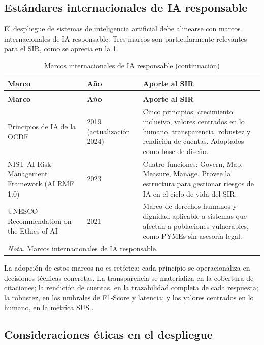 \documentclass[12pt,a4paper,oneside]{report}
\begin{document}
\subsection{Estándares internacionales de IA responsable}\label{subsec:estandares-internacionales-ia-responsable}

El despliegue de sistemas de inteligencia artificial debe alinearse con marcos internacionales de IA responsable. Tres marcos son particularmente relevantes para el SIR, como se aprecia en la \cref{tab:marcos-ia-responsable}.

\begin{longtable}{@{}p{}p{}p{}@{}}
\caption{Marcos internacionales de IA responsable}\label{tab:marcos-ia-responsable}\\
\toprule
\textbf{Marco} & \textbf{Año} & \textbf{Aporte al SIR} \\
\midrule
\endfirsthead
\caption[]{Marcos internacionales de IA responsable (continuación)}\\
\toprule
\textbf{Marco} & \textbf{Año} & \textbf{Aporte al SIR} \\
\midrule
\endhead
Principios de IA de la OCDE & 2019 (actualización 2024) & Cinco principios: crecimiento inclusivo, valores centrados en lo humano, transparencia, robustez y rendición de cuentas. Adoptados como base de diseño. \\
NIST AI Risk Management Framework (AI RMF 1.0) & 2023 & Cuatro funciones: Govern, Map, Measure, Manage. Provee la estructura para gestionar riesgos de IA en el ciclo de vida del SIR. \\
UNESCO Recommendation on the Ethics of AI & 2021 & Marco de derechos humanos y dignidad aplicable a sistemas que afectan a poblaciones vulnerables, como PYMEs sin asesoría legal. \\
\bottomrule
\multicolumn{3}{p{0.96\textwidth}}{\normalsize \textit{Nota.} Marcos internacionales de IA responsable.}\\
\end{longtable}

La adopción de estos marcos no es retórica: cada principio se operacionaliza en decisiones técnicas concretas. La transparencia se materializa en la cobertura de citaciones; la rendición de cuentas, en la trazabilidad completa de cada respuesta; la robustez, en los umbrales de F1-Score y latencia; y los valores centrados en lo humano, en la métrica SUS \parencite{oecd2024,nist2023,unesco2021}.

\subsection{Consideraciones éticas en el despliegue}\label{subsec:consideraciones-eticas-despliegue}
\end{document}
